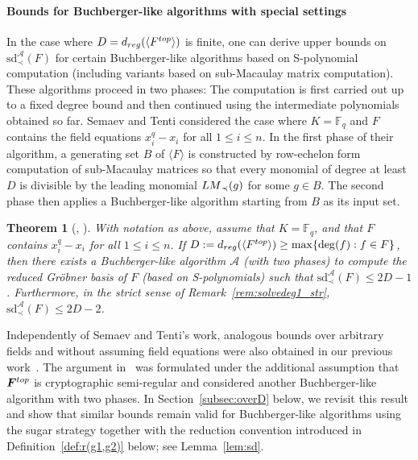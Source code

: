 \documentclass{article}
\newtheorem{theorem}{Theorem}[subsection]
\theoremstyle{definition}
\theoremstyle{plain}
\theoremstyle{plain}
\theoremstyle{plain}
\theoremstyle{plain}
\numberwithin{equation}{subsection}
\begin{document}
\paragraph{Bounds for Buchberger-like algorithms with special settings}
In the case where $D=d_{\rm reg}(\langle F^{\rm top}\rangle)$ is finite, one can derive upper bounds on $\mathrm{sd}_{\prec}^{\mathcal{A}}(F)$ for certain Buchberger-like algorithms based on S-polynomial computation (including variants based on sub-Macaulay matrix computation).
These algorithms proceed in two phases:
The computation is first carried out up to a fixed degree bound and then continued using the intermediate polynomials obtained so far.
Semaev and Tenti \cite{ST} considered the case where $K=\mathbb{F}_q$ and $F$ contains the field equations $x_i^q-x_i$ for all $1\le i\le n$. 
In the first phase of their algorithm, a generating set $B$ of $\langle F\rangle$ is constructed by row-echelon form computation of sub-Macaulay matrices so that every monomial of degree at least $D$ is divisible by the leading monomial ${\rm LM}_{\prec}(g)$ for some $g\in B$.
The second phase then applies a Buchberger-like algorithm starting from $B$ as its input set.

\begin{theorem}[{\cite[Theorem 2.1]{ST}, \cite[Theorem 3.65 \& Corollary 3.67]{Tenti}}]\label{thm:tenti}
    With notation as above, assume that $K=\mathbb{F}_q$, and that $F$ contains $x_i^q - x_i$ for all $1 \leq i \leq n$.
    If $ D :=d_{\rm reg}(\langle F^{\rm top} \rangle) \geq \max \{ \deg (f) : f \in F \}$, then there exists a Buchberger-like algorithm $\mathcal{A}$ (with two phases) to compute the reduced Gr\"{o}bner basis of $F$ (based on S-polynomials) such that $\mathrm{sd}^{\mathcal{A}}_{\prec}(F) \leq 2 D  - 1$. 
    Furthermore, in the strict sense of Remark~\ref{rem:solvedeg1_str}, $\mathrm{sd}^{\mathcal{A}}_{\prec}(F) \leq 2 D  - 2$. 
\end{theorem}

Independently of Semaev and Tenti's work, analogous bounds over arbitrary fields and without assuming field equations were also obtained in our previous work~\cite[Lemma~4]{KY}.
The argument in~\cite{KY} was formulated under the additional assumption that $\bm F^{\rm top}$ is cryptographic semi-regular and considered another Buchberger-like algorithm with two phases.
In Section~\ref{subsec:overD} below, we revisit this result and show that similar bounds remain valid for Buchberger-like algorithms using the sugar strategy together with the reduction convention introduced in Definition~\ref{def:r(g1,g2)} below; see Lemma~\ref{lem:sd}.
\end{document}

